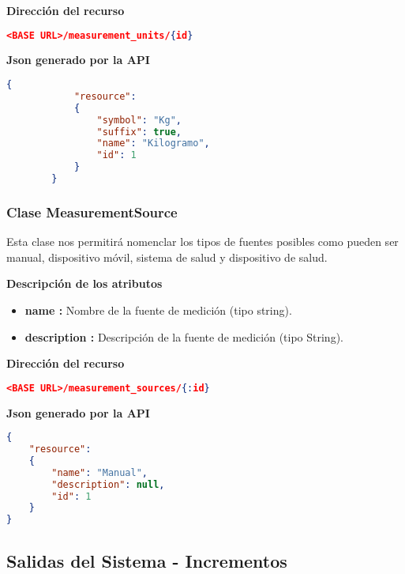     \textbf{Dirección del recurso}
        \begin{lstlisting}[language=json,firstnumber=1]
        <BASE URL>/measurement_units/{id}
        \end{lstlisting}

    \textbf{Json generado por la API} 
        \begin{lstlisting}[language=json,firstnumber=1]
        {
            "resource": 
            {
                "symbol": "Kg",
                "suffix": true,
                "name": "Kilogramo",
                "id": 1
            }
        }
        \end{lstlisting}

\subsubsection{Clase MeasurementSource}
Esta clase nos permitirá nomenclar los tipos de fuentes posibles como pueden ser manual, dispositivo móvil, sistema de salud y dispositivo de salud.
    
	\textbf{Descripción de los atributos}
        \begin{itemize}
            \item \textbf{name 	:}	Nombre de la fuente de medición (tipo string).
            \item \textbf{description 	:}	Descripción de la fuente de medición (tipo String).
        \end{itemize}
    \textbf{Dirección del recurso}
    \begin{lstlisting}[language=json,firstnumber=1]
    <BASE URL>/measurement_sources/{:id}
    \end{lstlisting}

    \textbf{Json generado por la API} 
    \begin{lstlisting}[language=json,firstnumber=1]
{
    "resource": 
    {
        "name": "Manual",
        "description": null,
        "id": 1
    }
}
    \end{lstlisting}
    
\clearpage
\newpage

\subsection {Salidas del Sistema - Incrementos}

